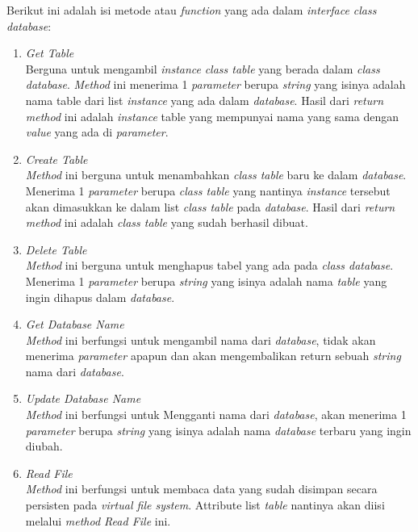 Berikut ini adalah isi metode atau \emph{function} yang ada dalam \emph{interface \emph{class} database}:
\begin{enumerate}
	\item \emph{Get Table} \\
	Berguna untuk mengambil \emph{instance} \emph{class table} yang berada dalam \emph{class database}. 
  \emph{Method} ini menerima 1 \emph{parameter} berupa \emph{string} yang isinya adalah nama table dari 
  list \emph{instance} yang ada dalam \emph{database}. Hasil dari \emph{return} \emph{method} ini adalah \emph{instance} 
  table yang mempunyai nama yang sama dengan \emph{value} yang ada di \emph{parameter}.


	\item \emph{Create Table} \\
  \emph{Method} ini berguna untuk menambahkan \emph{class table} baru ke dalam \emph{database}. Menerima 1 
  \emph{parameter} berupa \emph{class table} yang nantinya \emph{instance} tersebut akan dimasukkan ke 
  dalam list \emph{class table} pada \emph{database}. Hasil dari \emph{return method} ini adalah \emph{class 
  table} yang sudah berhasil dibuat. 


	\item \emph{Delete Table} \\
  \emph{Method} ini berguna untuk menghapus tabel yang ada pada \emph{class database}. Menerima 1 
  \emph{parameter} berupa \emph{string} yang isinya adalah nama \emph{table} yang ingin dihapus dalam 
  \emph{database}.

  
	\item \emph{Get Database Name} \\
  \emph{Method} ini berfungsi untuk mengambil nama dari \emph{database}, tidak akan menerima 
  \emph{parameter} apapun dan akan mengembalikan return sebuah \emph{string} nama dari \emph{database}.


	\item \emph{Update Database Name} \\
  \emph{Method} ini berfungsi untuk Mengganti nama dari \emph{database}, akan menerima 1 \emph{parameter} 
  berupa \emph{string} yang isinya adalah nama \emph{database} terbaru yang ingin diubah.


	\item \emph{Read File} \\
  \emph{Method} ini berfungsi untuk membaca data yang sudah disimpan secara persisten pada 
  \emph{virtual file system}. Attribute list \emph{table} nantinya akan diisi melalui \emph{method Read 
  File} ini.



\end{enumerate}
